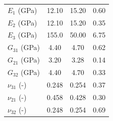 \documentclass[review]{elsarticle}
\begin{document}
\begin{description}
\begin{table}
\begin{tabular}{l c c c }
\hline %

$E_{1}$ (GPa) & 12.10 & 15.20 & 0.60\\
$E_{2}$ (GPa) & 12.10 & 15.20 & 0.35\\
$E_{3}$ (GPa) & 155.0 & 50.00 & 6.75\\

$G_{31}$ (GPa) & 4.40 & 4.70 & 0.62\\
$G_{21}$ (GPa) & 3.20 & 3.28 & 0.14\\
$G_{32}$ (GPa) & 4.40 & 4.70 & 0.33\\

$\nu_{31}$ (-) & 0.248 & 0.254 & 0.37\\
$\nu_{21}$ (-) & 0.458 & 0.428 & 0.30\\
$\nu_{32}$ (-) & 0.248 & 0.254 & 0.69\\





\hline %
\end{tabular}
\label{table:nonlin} %
\end{table}
\end{description}




\pagebreak


\end{document}
